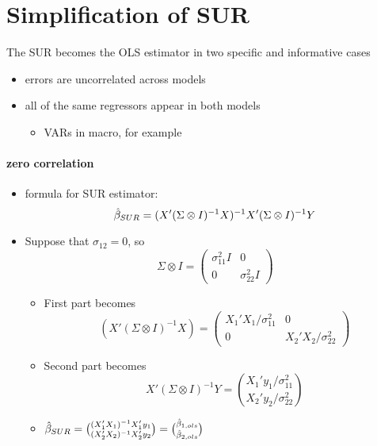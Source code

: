 \section{Simplification of SUR}

     The SUR becomes the OLS estimator in two specific and informative
     cases
\begin{itemize}
\item errors are uncorrelated across models
\item all of the same regressors appear in both models
\begin{itemize}
\item VARs in macro, for example
\end{itemize}
\end{itemize}

\paragraph{zero correlation}
\begin{itemize}
\item formula for SUR estimator:
  \[\hat{\beta}_{SUR} = (X'(\Sigma \otimes I)^{-1}X)^{-1}X'(\Sigma \otimes I)^{-1}Y\]
\item Suppose that $\sigma_{12} = 0$, so
  \[ \Sigma \otimes I = (\begin{matrix} \sigma_{11}^2 I & 0 \\ 0 & \sigma_{22}^2 I \end{matrix})\]
\begin{itemize}
\item First part becomes
  \[(X'( \Sigma \otimes I)^{-1} X) =
  \begin{pmatrix} X_1'X_1 / \sigma_{11}^2 & 0 \\ 0 & X_2'X_2 / \sigma_{22}^2 \end{pmatrix}\]
\item Second part becomes 
  \[X'(\Sigma \otimes I)^{-1}Y = \binom{X_1' y_1 / \sigma_{11}^2}{X_2'y_2 / \sigma_{22}^2}\]
\item $\hat{\beta}_{SUR} = \binom{(X_1'X_1)^{-1}X_1'y_1}{(X_2'X_2)^{-1}X_2'y_2} =
  \binom{\hat{\beta}_{1,ols}}{\hat{\beta}_{2,ols}}$
\end{itemize}
\end{itemize}

